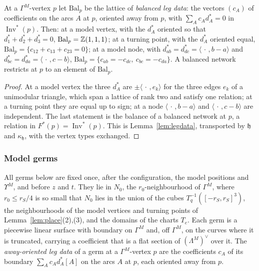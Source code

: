 \begin{lemma}\label{lem:unitgerms}
At a $\Gamma^M$-vertex $p$ let $\mathrm{Bal}_p$ be the lattice of \emph{balanced leg data}: the vectors $(c_A)$ of coefficients on
the arcs $A$ at $p$, oriented away from $p$, with $\sum_Ac_Ad^*_A=0$ in $\operatorname{Inv}^*(p)$. Then: at a model vertex,
with the $d^*_A$ oriented so that $d^*_1+d^*_2+d^*_3=0$, $\mathrm{Bal}_p=\mathbb Z(1,1,1)$; at a turning point, with the $d^*_A$ oriented
equal, $\mathrm{Bal}_p=\{c_{12}+c_{13}+c_{23}=0\}$; at a model node, with $d^*_{ab}=d^*_{dc}=\langle\,\cdot\,,b-a\rangle$ and
$d^*_{bc}=d^*_{da}=\langle\,\cdot\,,c-b\rangle$, $\mathrm{Bal}_p=\{c_{ab}=-c_{dc},\ c_{bc}=-c_{da}\}$. A balanced network
restricts at $p$ to an element of $\mathrm{Bal}_p$.
\end{lemma}

\begin{proof}
At a model vertex the three $d^*_A$ are $\pm\langle\,\cdot\,,e_k\rangle$ for the three edges $e_k$ of a unimodular triangle,
which span a lattice of rank two and satisfy one relation; at a turning point they are equal up to sign; at a node
$\langle\,\cdot\,,b-a\rangle$ and $\langle\,\cdot\,,c-b\rangle$ are independent. The last statement is the balance of a balanced network
at $p$, a relation in $F^*(p)=\operatorname{Inv}^*(p)$. This is Lemma~\ref{lem:legdata}, transported by $\mathfrak h$ and
$\kappa_{\mathfrak h}$, with the
vertex types exchanged.
\end{proof}

\subsubsection*{Model germs}
All germs below are fixed once, after the configuration, the model positions and $\Upsilon^M$, and before $z$ and $t$.
They lie in $N_0$, the $r_0$-neighbourhood of $\Gamma^M$, where $r_0\le r_S/4$ is so small that $N_0$ lies in the union of
the cubes $T_q^{-1}([-r_S,r_S]^3)$, the neighbourhoods of the model vertices and turning points of
Lemma~\ref{lem:place}(2),(3), and the domains of the charts $T_e$. Each germ is a piecewise linear surface with boundary
on $\Gamma^M$ and, off $\Gamma^M$, on the curves where it is truncated, carrying a coefficient that is a flat section of $(\Lambda^M)^\vee$ over it. The
\emph{away-oriented leg data} of a germ at a $\Gamma^M$-vertex $p$ are the coefficients $c_A$ of its boundary
$\sum_Ac_Ad^*_A[A]$ on the arcs $A$ at $p$, each oriented away from $p$.

